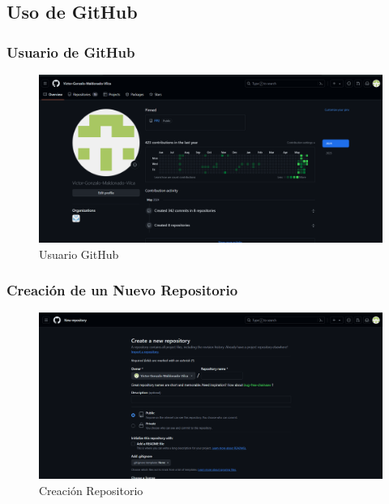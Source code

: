 \documentclass{article}
\begin{document}
  
	
  \subsection{Uso de GitHub}
  

	\subsubsection{Usuario de GitHub}
  \begin{figure}[H]
    \centering
    \includegraphics[width=1\textwidth, keepaspectratio]{img/usuario.png}
    \caption{Usuario GitHub}
  \end{figure}
  

  \subsubsection{Creación de un Nuevo Repositorio}
  \begin{figure}[H]
    \centering
    \includegraphics[width=1\textwidth, keepaspectratio]{img/CrearRepo.png}
    \caption{Creación Repositorio}
  \end{figure}
  \newpage
  
\end{document}
